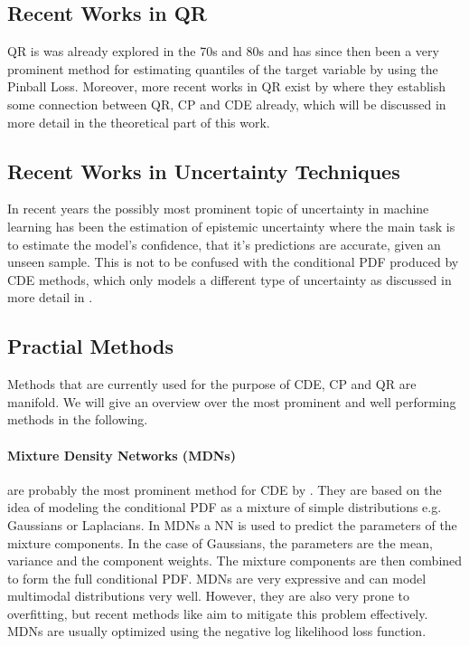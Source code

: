 \subsection{Recent Works in QR}

QR is was already explored in the 70s and 80s \cite{koenker1978regression} and has since then been a very prominent method for estimating quantiles of the target variable by using the Pinball Loss. Moreover, more recent works in QR exist by \cite{chung2020beyond} where they establish some connection between QR, CP and CDE already, which will be discussed in more detail in the theoretical part of this work.

\subsection{Recent Works in Uncertainty Techniques}

In recent years the possibly most prominent topic of uncertainty in machine learning has been the estimation of epistemic uncertainty \cite{barber1998ensemble, neal2012bayesian, gal_dropout_2016,schweighofer2023quantification, gawlikowski2023survey} where the main task is to estimate the model's confidence, that it's predictions are accurate, given an unseen sample. This is not to be confused with the conditional PDF produced by CDE methods, which only models a different type of uncertainty as discussed in more detail in .

\subsection{Practial Methods}
Methods that are currently used for the purpose of CDE, CP and QR are manifold. We will give an overview over the most prominent and well performing methods in the following.

\paragraph{Mixture Density Networks (MDNs)} are probably the most prominent method for CDE by \cite{bishop1994mixture}. They are based on the idea of modeling the conditional PDF as a mixture of simple distributions e.g. Gaussians or Laplacians. In MDNs a NN is used to predict the parameters of the mixture components. In the case of Gaussians, the parameters are the mean, variance and the component weights. The mixture components are then combined to form the full conditional PDF. MDNs are very expressive and can model multimodal distributions very well. However, they are also very prone to overfitting, but recent methods like \cite{rothfuss2019noise} aim to mitigate this problem effectively. MDNs are usually optimized using the negative log likelihood loss function.

